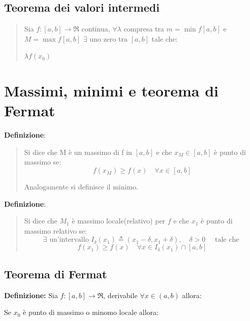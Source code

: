 \documentclass{article}
\begin{document}
\subsection{Teorema dei valori intermedi}

\begin{quote}
    Sia $f: [a, b] \rightarrow \Re$ continua,
    $\forall \lambda$ compresa tra $m = \min f[a, b]$ e $M = \max f[a, b]$
    $\exists$ uno zero tra $[a, b]$ tale che:

    $\lambda f(x_0)$
\end{quote}
    
\section{Massimi, minimi e teorema di Fermat}


\textbf{Definizione}:
\begin{quote}
    Si dice che M è un massimo di f in $[a, b]$ e che $x_M \in [a, b]$ è punto di
    massimo se:
    \begin{equation*}
        f(x_M) \geq f(x) \quad \forall x \in [a, b]
    \end{equation*}

    Analogamente si definisce il minimo.
\end{quote}


\textbf{Definizione}:
\begin{quote}
    Si dice che $M_1$ è massimo locale(relativo) per $f$ e che $x_1$ è punto di massimo relativo se:
    \begin{equation*}
       \exists \text{ un'intervallo } I_{\delta}(x_1) \triangleq (x_1 - \delta, x_1 + \delta), \quad \delta > 0 \quad \text{ tale che }
    \end{equation*}
    \begin{equation*}
        f(x_1) \geq f(x) \quad \forall x \in I_{\delta} (x_1) \cap [a, b]
    \end{equation*}
  
\end{quote}



    \subsection{Teorema di Fermat}
    \textbf{Definizione:}
    Sia $f:[a, b] \rightarrow \Re$, derivabile $\forall x \in (a, b)$ allora:

    Se $x_0$ è punto di massimo o minomo locale allora:
\end{document}
